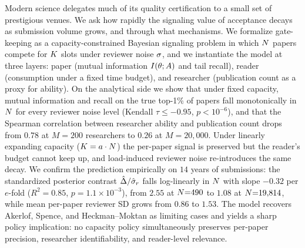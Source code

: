 Modern science delegates much of its quality certification to a small set of prestigious venues. We ask how rapidly the signaling value of acceptance decays as submission volume grows, and through what mechanisms. We formalize gate-keeping as a capacity-constrained Bayesian signaling problem in which $N$ papers compete for $K$ slots under reviewer noise $\sigma$, and we instantiate the model at three layers: paper (mutual information $I(\theta;A)$ and tail recall), reader (consumption under a fixed time budget), and researcher (publication count as a proxy for ability). On the analytical side we show that under fixed capacity, mutual information and recall on the true top-1\% of papers fall monotonically in $N$ for every reviewer noise level (Kendall $\tau\le-0.95$, $p<10^{-6}$), and that the Spearman correlation between researcher ability and publication count drops from $0.78$ at $M{=}200$ researchers to $0.26$ at $M{=}20{,}000$. Under linearly expanding capacity ($K = a \cdot N$) the per-paper signal is preserved but the reader's budget cannot keep up, and load-induced reviewer noise re-introduces the same decay. We confirm the prediction empirically on $14$ years of \iclr submissions: the standardized posterior contrast $\hat{\Delta}/\hat{\sigma}_r$ falls log-linearly in $N$ with slope $-0.32$ per $e$-fold ($R^2=0.85$, $p=1.1\times10^{-3}$), from $2.55$ at $N{=}490$ to $1.08$ at $N{=}19{,}814$, while mean per-paper reviewer SD grows from $0.86$ to $1.53$. The model recovers Akerlof, Spence, and Heckman--Moktan as limiting cases and yields a sharp policy implication: no capacity policy simultaneously preserves per-paper precision, researcher identifiability, and reader-level relevance.
